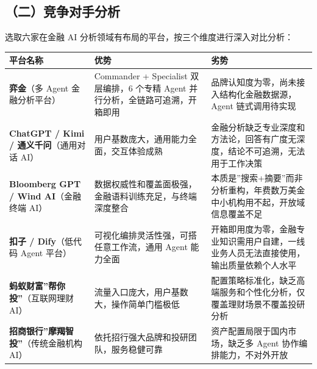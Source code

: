 \documentclass[
]{ctexart}
\begin{document}
\subsection{（二）竞争对手分析}\label{ux4e8cux7adeux4e89ux5bf9ux624bux5206ux6790}

选取六家在金融 AI 分析领域有布局的平台，按三个维度进行深入对比分析：

\begin{longtable}[]{@{}
  >{\raggedright\arraybackslash}p{}
  >{\raggedright\arraybackslash}p{}
  >{\raggedright\arraybackslash}p{}@{}}
\toprule\noalign{}
\begin{minipage}[b]{\linewidth}\raggedright
平台名称
\end{minipage} & \begin{minipage}[b]{\linewidth}\raggedright
优势
\end{minipage} & \begin{minipage}[b]{\linewidth}\raggedright
劣势
\end{minipage} \\
\midrule\noalign{}
\endhead
\bottomrule\noalign{}
\endlastfoot
\textbf{弈金}（多 Agent 金融分析平台） & Commander + Specialist
双层编排，6 个专精 Agent 并行分析，全链路可追溯，开箱即用 &
品牌认知度为零，尚未接入结构化金融数据源，Agent 链式调用待实现 \\
\textbf{ChatGPT / Kimi / 通义千问}（通用对话 AI） &
用户基数庞大，通用能力全面，交互体验成熟 &
金融分析缺乏专业深度和方法论，回答有广度无深度，结论不可追溯，无法用于工作决策 \\
\textbf{Bloomberg GPT / Wind AI}（金融终端 AI） &
数据权威性和覆盖面极强，金融语料训练充足，与终端深度整合 &
本质是''搜索+摘要''而非分析重构，年费数万美金中小机构用不起，开放域信息覆盖不足 \\
\textbf{扣子 / Dify}（低代码 Agent 平台） &
可视化编排灵活性强，可搭任意工作流，通用 Agent 能力全面 &
开箱即用度为零，金融专业知识需用户自建，一线业务人员无法直接使用，输出质量依赖个人水平 \\
\textbf{蚂蚁财富''帮你投''}（互联网理财 AI） &
流量入口庞大，用户基数大，操作简单门槛极低 &
配置策略标准化，缺乏高端服务和个性化分析，仅覆盖理财场景不覆盖投研分析 \\
\textbf{招商银行''摩羯智投''}（传统金融机构 AI） &
依托招行强大品牌和投研团队，服务稳健可靠 &
资产配置局限于国内市场，缺乏多 Agent 协作编排能力，不对外开放 \\
\end{longtable}
\end{document}
